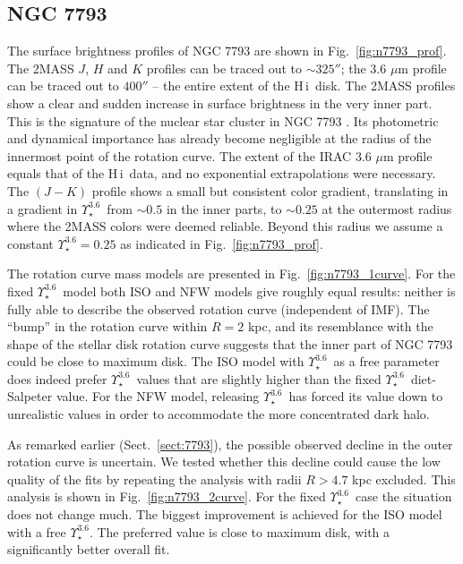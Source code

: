 \documentclass[usenatbib,usegraphicx,apjfonts,floatfix]{emulateapj}
\newcommand{\HI}{H\,{\sc i}}
\newcommand{\Ups}{\ensuremath{\Upsilon_{\star}^{3.6}}}
\begin{document}
\subsection{NGC 7793}

The surface brightness profiles of NGC 7793 are shown in
Fig.~\ref{fig:n7793_prof}. The 2MASS $J$, $H$ and $K$ profiles can be
traced out to $\sim 325''$; the 3.6 $\mu$m profile can be traced out
to $400''$ -- the entire extent of the \HI\ disk.  The 2MASS profiles
show a clear and sudden increase in surface brightness in the very
inner part. This is the signature of the nuclear star cluster in NGC
7793 \citep{boker02}. Its photometric and dynamical importance has
already become negligible at the radius of the innermost point of the
rotation curve.  The extent of the IRAC 3.6 $\mu$m profile equals that
of the \HI\ data, and no exponential extrapolations were necessary.
The $(J-K)$ profile shows a small but consistent color gradient,
translating in a gradient in \Ups\ from $\sim 0.5$ in the inner parts,
to $\sim 0.25$ at the outermost radius where the 2MASS colors were
deemed reliable. Beyond this radius we assume a constant $\Ups = 0.25$
as indicated in Fig.\ \ref{fig:n7793_prof}.

The rotation curve mass models are presented in
Fig.~\ref{fig:n7793_1curve}.  For the fixed \Ups\ model both ISO and
NFW models give roughly equal results: neither is fully able to
describe the observed rotation curve (independent of IMF).  The
``bump'' in the rotation curve within $R=2$ kpc, and its resemblance
with the shape of the stellar disk rotation curve suggests that the
inner part of NGC 7793 could be close to maximum disk. The ISO model
with \Ups\ as a free parameter does indeed prefer \Ups\ values that
are slightly higher than the fixed \Ups\ diet-Salpeter value. For the
NFW model, releasing \Ups\ has forced its value down to unrealistic
values in order to accommodate the more concentrated dark halo.

As remarked earlier (Sect.\ \ref{sect:7793}), the possible observed
decline in the outer rotation curve is uncertain.  We tested whether
this decline could cause the low quality of the fits by repeating the
analysis with radii $R>4.7$ kpc excluded. This analysis is shown in
Fig.~\ref{fig:n7793_2curve}.  For the fixed \Ups\ case the situation
does not change much. The biggest improvement is achieved for the ISO
model with a free \Ups. The preferred value is close to maximum disk,
with a significantly better overall fit.
\end{document}
